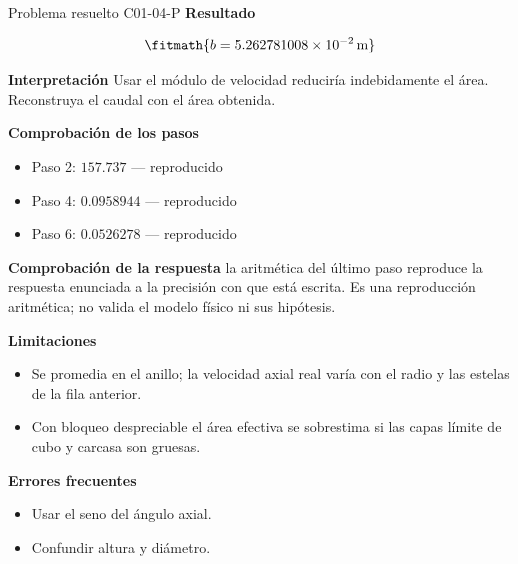 \documentclass[10pt,openany]{book}
\begin{document}
\begin{studiumworked}{Problema resuelto C01-04-P}
\noindent\textbf{Resultado}

\[
\fitmath{b=5.262781008\times10^{-2}\,\mathrm{m}}
\]

\noindent\textbf{Interpretación}
Usar el módulo de velocidad reduciría indebidamente el área. Reconstruya el caudal con el área obtenida.

\noindent\textbf{Comprobación de los pasos}
\begin{itemize}
\item Paso 2: $157.737$ — reproducido
\item Paso 4: $0.0958944$ — reproducido
\item Paso 6: $0.0526278$ — reproducido
\end{itemize}

\noindent\textbf{Comprobación de la respuesta} la aritmética del último paso reproduce la respuesta enunciada a la precisión con que está escrita. Es una reproducción aritmética; no valida el modelo físico ni sus hipótesis.

\noindent\textbf{Limitaciones}
\begin{itemize}
\item Se promedia en el anillo; la velocidad axial real varía con el radio y las estelas de la fila anterior.
\item Con bloqueo despreciable el área efectiva se sobrestima si las capas límite de cubo y carcasa son gruesas.
\end{itemize}

\noindent\textbf{Errores frecuentes}
\begin{itemize}
\item Usar el seno del ángulo axial.
\item Confundir altura y diámetro.
\end{itemize}
\end{studiumworked}
\end{document}
